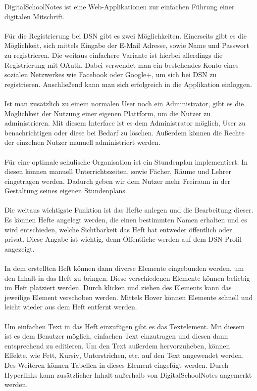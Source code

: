 DigitalSchoolNotes ist eine Web-Applikationen zur einfachen Führung einer digitalen Mitschrift.\\\\
Für die Registrierung bei DSN gibt es zwei Möglichkeiten. Einerseits gibt es die Möglichkeit, sich mittels Eingabe der E-Mail Adresse, sowie Name und Passwort zu registrieren. Die weitaus einfachere Variante ist hierbei allerdings die Registrierung mit OAuth. Dabei verwendet man ein bestehendes Konto eines sozialen Netzwerkes wie Facebook oder Google+, um sich bei DSN zu registrieren. Anschließend kann man sich erfolgreich in die Applikation einloggen.\\
\\
Ist man zusätzlich zu einem normalen User noch ein Administrator, gibt es die Möglichkeit der Nutzung einer eigenen Plattform, um die Nutzer zu administrieren. Mit diesem Interface ist es dem Administrator möglich, User zu benachrichtigen oder diese bei Bedarf zu löschen. Außerdem können die Rechte der einzelnen Nutzer manuell administriert werden.\\
\\
Für eine optimale schulische Organisation ist ein Stundenplan implementiert. In diesen können manuell Unterrichtszeiten, sowie Fächer, Räume und Lehrer eingetragen werden. Dadurch geben wir dem Nutzer mehr Freiraum in der Gestaltung seines eigenen Stundenplans.\\
\\
Die weitaus wichtigste Funktion ist das Hefte anlegen und die Bearbeitung dieser. Es können Hefte angelegt werden, die einen bestimmten Namen erhalten und es wird entschieden, welche Sichtbarkeit das Heft hat entweder öffentlich oder privat. Diese Angabe ist wichtig, denn Öffentliche werden auf dem DSN-Profil angezeigt.\\
\\
In dem erstellten Heft können dann diverse Elemente eingebunden werden, um den Inhalt in das Heft zu bringen. Diese verschiedenen Elemente können beliebig im Heft platziert werden. Durch klicken und ziehen des Elements kann das jeweilige Element verschoben werden. Mittels Hover können Elemente schnell und leicht wieder aus dem Heft entfernt werden.\\
\\
Um einfachen Text in das Heft einzufügen gibt es das Textelement. Mit diesem ist es dem Benutzer möglich, einfachen Text einzutragen und diesen dann entsprechend zu editieren. Um den Text außerdem hervorzuheben, können Effekte, wie Fett, Kursiv, Unterstrichen, etc. auf den Text angewendet werden. Des Weiteren können Tabellen in dieses Element eingefügt werden. Durch Hyperlinks kann zusätzlicher Inhalt außerhalb von DigitalSchoolNotes angemerkt werden.\\
